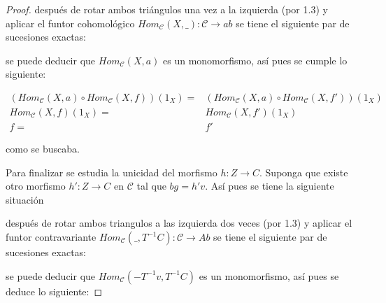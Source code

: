 \documentclass{article}
\newcommand{\cc}{\mathscr{C}}
\begin{document}
\begin{enumerate}
\begin{proof}
después de rotar ambos triángulos una vez a la izquierda (por 1.3) y aplicar el funtor cohomol\'ogico $Hom_{\cc}(X,\_):\cc \to ab$ se tiene el siguiente par de sucesiones exactas:

\begin{center}
\end{center}
se puede deducir que $Hom_{\cc}(X,a)$ es un monomorfismo, así pues se cumple lo siguiente:

\begin{align*}
(Hom_{\cc}(X,a)\circ Hom_{\cc}(X,f))(1_{X}) =& (Hom_{\cc}(X,a)\circ Hom_{\cc}(X,f'))(1_{X})\\
Hom_{\cc}(X,f)(1_{X}) =& Hom_{\cc}(X,f')(1_{X})\\
f =& f'
\end{align*}

como se buscaba.

\bigskip

Para finalizar se estudia la unicidad del morfismo $h:Z\to C$. Suponga que existe otro morfismo $h':Z\to C$ en $\mathcal{C}$ tal que $bg=h'v$. As\'i pues se tiene la siguiente situaci\'on

\begin{center}
\end{center}

despu\'es de rotar ambos triangulos a las izquierda dos veces (por 1.3) y aplicar el funtor contravariante $Hom_{\mathcal{C}}(\_,T^{-1}C):\mathcal{C} \to Ab$ se tiene el siguiente par de sucesiones exactas:

\begin{center}
\end{center}
se puede deducir que $Hom_{\cc}(-T^{-1}v,T^{-1}C)$ es un monomorfismo, as\'i pues se deduce lo siguiente:


\end{proof}
\end{enumerate}
\end{document}
